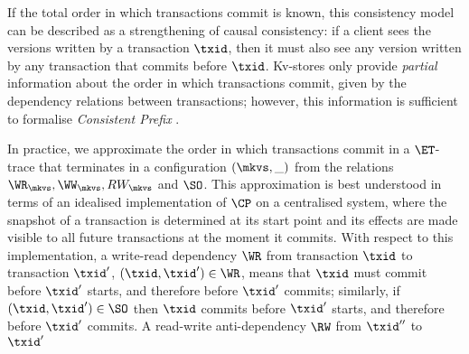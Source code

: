 \label{para:cp}
If the total order in which transactions commit is known, this consistency model 
can be described as a strengthening of causal consistency: 
if a client sees the versions written by a transaction $\txid$,
then it must also see any version written by any transaction that commits before $\txid$. 
Kv-stores only provide {\em partial} information about the order in which transactions commit, 
given by the dependency relations between transactions; however, 
this information is sufficient to formalise \emph{Consistent Prefix} \cite{laws}.

In practice, we approximate the order in which transactions 
commit in a $\ET$-trace that terminates in a configuration $(\mkvs, \_)$ from the relations $\WR_{\mkvs}, \WW_{\mkvs}, 
RW_{\mkvs}$ and $\SO$. This approximation is best understood in terms of an idealised implementation of 
$\CP$ on a centralised system,
where the snapshot of a transaction is determined at its start point and its effects are made visible 
to all future transactions at the moment it commits. 
With respect to this implementation, a write-read dependency \(\WR\) from transaction $\txid$ to transaction $\txid'$, 
$(\txid,\txid') \in \WR$, means that 
$\txid$ {must} commit before $\txid'$ starts, and therefore before $\txid'$ commits; 
similarly, if $(\txid,\txid') \in \SO$ then $\txid$ commits before $\txid'$ starts, 
and therefore before $\txid'$ commits.
% 
A read-write anti-dependency \(\RW\) from $\txid''$ to $\txid'$ 
